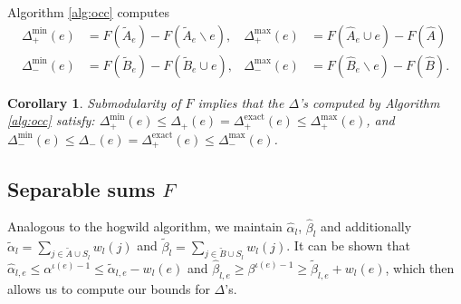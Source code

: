 \documentclass{article} %
\newtheorem{cor}[thm]{Corollary}
\begin{document}
Algorithm \ref{alg:occ} computes
\begin{align*}
  \Delta_+^{\min}(e) &= F(\tilde{A}_e) - F(\tilde{A}_e \backslash e),
& \Delta_+^{\max}(e) &= F(\hat{A}_e \cup e) - F(\hat{A})\\
  \Delta_-^{\min}(e) &= F(\tilde{B}_e) - F(\tilde{B}_e \cup e),
& \Delta_-^{\max}(e) &= F(\hat{B}_e \backslash e) - F(\hat{B}).
\end{align*}

\begin{cor}\label{lem:occdeltas} Submodularity of $F$ implies that the $\Delta$'s computed by Algorithm \ref{alg:occ} satisfy: $\Delta_+^{\min}(e) \leq \Delta_+(e) = \Delta_+^{\text{exact}}(e) \leq \Delta_+^{\max}(e)$, and $\Delta_-^{\min}(e) \leq \Delta_-(e) = \Delta_+^{\text{exact}}(e) \leq \Delta_-^{\max}(e)$.
\end{cor}

\subsection{Separable sums $F$}
Analogous to the hogwild algorithm, we maintain $\hat\alpha_l$, $\hat\beta_l$ and additionally $\tilde\alpha_l = \sum_{j\in \tilde{A}\cup S_l} w_l(j)$ and $\tilde\beta_l = \sum_{j \in \tilde{B}\cup S_l} w_l(j)$.
It can be shown that $\hat\alpha_{l,e} \leq \alpha^{\iota(e)-1} \leq \tilde\alpha_{l,e} - w_l(e)$ and $\hat\beta_{l,e} \geq \beta^{\iota(e)-1} \geq \tilde\beta_{l,e} + w_l(e)$, which then allows us to compute our bounds for $\Delta$'s.%
\end{document}
